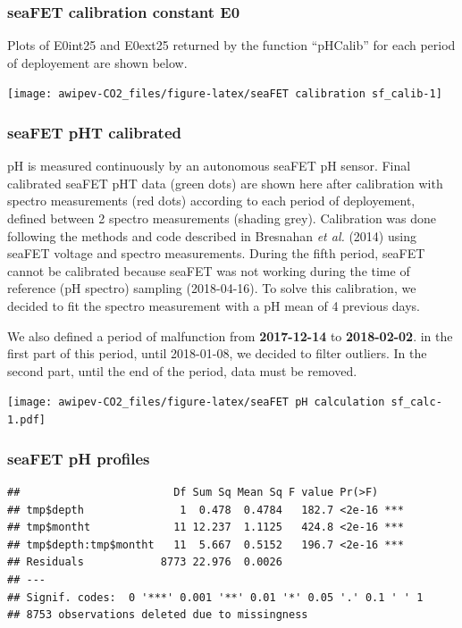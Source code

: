 \documentclass[
]{article}
\begin{document}
\hypertarget{seafet-calibration-constant-e0}{%
\subsubsection{\texorpdfstring{\textbf{seaFET calibration constant
E0}}{seaFET calibration constant E0}}\label{seafet-calibration-constant-e0}}

Plots of E0int25 and E0ext25 returned by the function ``pHCalib'' for
each period of deployement are shown below.

\texttt{[image: awipev-CO2\_files/figure-latex/seaFET calibration sf\_calib-1]}

\hypertarget{seafet-pht-calibrated}{%
\subsubsection{\texorpdfstring{\textbf{seaFET pHT
calibrated}}{seaFET pHT calibrated}}\label{seafet-pht-calibrated}}

pH is measured continuously by an autonomous seaFET pH sensor. Final
calibrated seaFET pHT data (green dots) are shown here after calibration
with spectro measurements (red dots) according to each period of
deployement, defined between 2 spectro measurements (shading grey).
Calibration was done following the methods and code described in
Bresnahan \emph{et al.} (2014) using seaFET voltage and spectro
measurements. During the fifth period, seaFET cannot be calibrated
because seaFET was not working during the time of reference (pH spectro)
sampling (2018-04-16). To solve this calibration, we decided to fit the
spectro measurement with a pH mean of 4 previous days.

We also defined a period of malfunction from \textbf{2017-12-14} to
\textbf{2018-02-02}. in the first part of this period, until 2018-01-08,
we decided to filter outliers. In the second part, until the end of the
period, data must be removed.

\texttt{[image: awipev-CO2\_files/figure-latex/seaFET pH calculation sf\_calc-1.pdf]}

\hypertarget{seafet-ph-profiles}{%
\subsubsection{\texorpdfstring{\textbf{seaFET pH
profiles}}{seaFET pH profiles}}\label{seafet-ph-profiles}}

\begin{verbatim}
##                        Df Sum Sq Mean Sq F value Pr(>F)    
## tmp$depth               1  0.478  0.4784   182.7 <2e-16 ***
## tmp$montht             11 12.237  1.1125   424.8 <2e-16 ***
## tmp$depth:tmp$montht   11  5.667  0.5152   196.7 <2e-16 ***
## Residuals            8773 22.976  0.0026                   
## ---
## Signif. codes:  0 '***' 0.001 '**' 0.01 '*' 0.05 '.' 0.1 ' ' 1
## 8753 observations deleted due to missingness
\end{verbatim}
\end{document}
